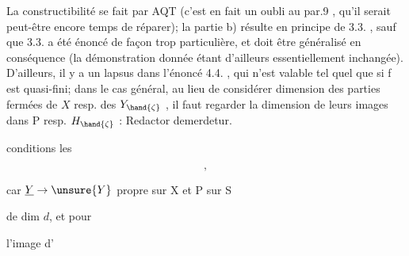 
La constructibilité se fait par AQT (c'est en fait un oubli au
par.9 , qu'il serait peut-être encore temps de réparer); la partie b)
résulte en principe de 3.3. , sauf que 3.3. a été énoncé de façon trop
particulière, et doit être généralisé en conséquence (la démonstration
donnée étant d'ailleurs essentiellement inchangée). D'ailleurs, il y
a un lapsus dans l'énoncé 4.4. , qui n'est valable tel quel que si f
est quasi-fini; dans le cas général, au lieu de considérer  dimension
\hand{(}des parties fermées de $X$ resp. des $Y_{\hand{\zeta}}$ , il faut regarder la dimension
de leurs images dans P resp. $H_{\hand{\zeta}}$ : Redactor demerdetur.

  conditions  les






\[  , \]

 car $\underline{Y} \to \unsure{Y}$ propre sur X et P  sur S




de dim $d$,  et pour

l'image d'






